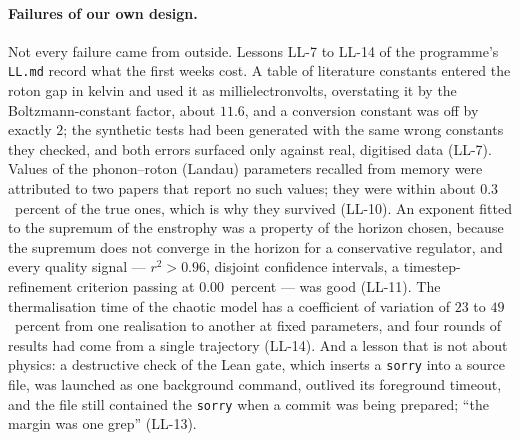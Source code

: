 \paragraph{Failures of our own design.} Not every failure came from outside. Lessons LL-7 to LL-14 of the programme's \texttt{LL.md} record
what the first weeks cost. A table of literature constants entered the roton gap in kelvin and used it as millielectronvolts, overstating it by the
Boltzmann-constant factor, about $11.6$, and a conversion constant was off by exactly $2$; the synthetic tests had been generated with the same wrong
constants they checked, and both errors surfaced only against real, digitised data (LL-7). Values of the phonon--roton (Landau) parameters recalled from memory were attributed to two
papers that report no such values; they were within about $0.3$~percent of the true ones, which is why they survived (LL-10). An exponent fitted to the
supremum of the enstrophy was a property of the horizon chosen, because the supremum does not converge in the horizon for a conservative regulator,
and every quality signal --- $r^2>0.96$, disjoint confidence intervals, a timestep-refinement criterion passing at $0.00$~percent --- was good (LL-11).
The thermalisation time of the chaotic model has a coefficient of variation of $23$ to $49$~percent from one realisation to another at fixed parameters, and four rounds
of results had come from a single trajectory (LL-14). And a lesson that is not about physics: a destructive check of the Lean gate, which inserts a
\texttt{sorry} into a source file, was launched as one background command, outlived its foreground timeout, and the file still contained the
\texttt{sorry} when a commit was being prepared; ``the margin was one grep'' (LL-13).

